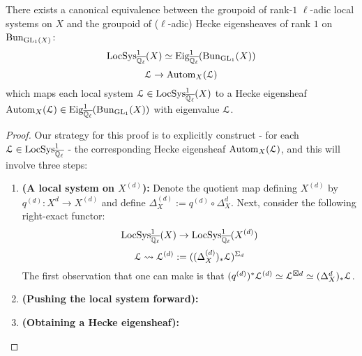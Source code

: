         \begin{theorem} \label{theorem: unramified_abelian_geometric_class_field_theory}
            There exists a canonical equivalence between the groupoid of rank-$1$ $\ell$-adic local systems on $X$ and the groupoid of ($\ell$-adic) Hecke eigensheaves of rank $1$ on $\mathrm{Bun}_{\operatorname{GL}_1(X)}$:
                $$\mathrm{LocSys}^1_{\overline{\mathbb{Q}_{\ell}}}(X) \simeq \mathrm{Eig}^1_{\overline{\mathbb{Q}_{\ell}}}(\mathrm{Bun}_{\operatorname{GL}_1}(X))$$
                $$\mathcal{L} \to \mathrm{Autom}_X(\mathcal{L})$$
            which maps each local system $\mathcal{L} \in \mathrm{LocSys}^1_{\overline{\mathbb{Q}_{\ell}}}(X)$ to a Hecke eigensheaf $\mathrm{Autom}_X(\mathcal{L}) \in \mathrm{Eig}^1_{\overline{\mathbb{Q}_{\ell}}}(\mathrm{Bun}_{\operatorname{GL}_1}(X))$ with eigenvalue $\mathcal{L}$.
        \end{theorem}
            \begin{proof}
                Our strategy for this proof is to explicitly construct - for each $\mathcal{L} \in \mathrm{LocSys}^1_{\overline{\mathbb{Q}_{\ell}}}$ - the corresponding Hecke eigensheaf $\mathrm{Autom}_X(\mathcal{L})$, and this will involve three steps:
                    \begin{enumerate}
                        \item \textbf{(A local system on $X^{(d)}$):} Denote the quotient map defining $X^{(d)}$ by $q^{(d)}: X^d \to X^{(d)}$ and define $\Delta_X^{(d)} := q^{(d)} \circ \Delta_X^d$. Next, consider the following right-exact functor:
                            $$\mathrm{LocSys}^1_{\overline{\mathbb{Q}_{\ell}}}(X) \to \mathrm{LocSys}^1_{\overline{\mathbb{Q}_{\ell}}}(X^{(d)})$$
                            $$\mathcal{L} \leadsto \mathcal{L}^{(d)} := ((\Delta_X^{(d)})_*\mathcal{L})^{\Sigma_d}$$
                        The first observation that one can make is that $(q^{(d)})^*\mathcal{L}^{(d)} \simeq \mathcal{L}^{\boxtimes d} \simeq (\Delta_X^d)_*\mathcal{L}$.
                        \item \textbf{(Pushing the local system forward):}
                        \item \textbf{(Obtaining a Hecke eigensheaf):}
                    \end{enumerate}
            \end{proof}
